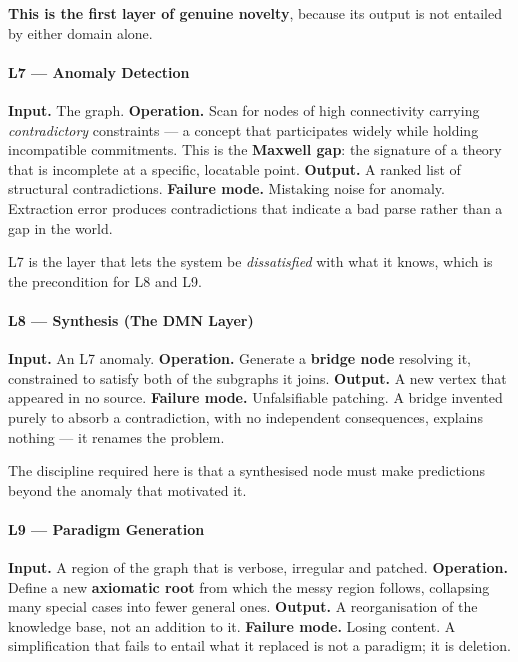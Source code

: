 \documentclass[
  11pt,
  a4paper,
]{article}
\begin{document}
\textbf{This is the first layer of genuine novelty}, because its output
is not entailed by either domain alone.

\paragraph{L7 --- Anomaly Detection}\label{l7-anomaly-detection}

\textbf{Input.} The graph. \textbf{Operation.} Scan for nodes of high
connectivity carrying \emph{contradictory} constraints --- a concept
that participates widely while holding incompatible commitments. This is
the \textbf{Maxwell gap}: the signature of a theory that is incomplete
at a specific, locatable point. \textbf{Output.} A ranked list of
structural contradictions. \textbf{Failure mode.} Mistaking noise for
anomaly. Extraction error produces contradictions that indicate a bad
parse rather than a gap in the world.

L7 is the layer that lets the system be \emph{dissatisfied} with what it
knows, which is the precondition for L8 and L9.

\paragraph{L8 --- Synthesis (The DMN
Layer)}\label{l8-synthesis-the-dmn-layer}

\textbf{Input.} An L7 anomaly. \textbf{Operation.} Generate a
\textbf{bridge node} resolving it, constrained to satisfy both of the
subgraphs it joins. \textbf{Output.} A new vertex that appeared in no
source. \textbf{Failure mode.} Unfalsifiable patching. A bridge invented
purely to absorb a contradiction, with no independent consequences,
explains nothing --- it renames the problem.

The discipline required here is that a synthesised node must make
predictions beyond the anomaly that motivated it.

\paragraph{L9 --- Paradigm Generation}\label{l9-paradigm-generation}

\textbf{Input.} A region of the graph that is verbose, irregular and
patched. \textbf{Operation.} Define a new \textbf{axiomatic root} from
which the messy region follows, collapsing many special cases into fewer
general ones. \textbf{Output.} A reorganisation of the knowledge base,
not an addition to it. \textbf{Failure mode.} Losing content. A
simplification that fails to entail what it replaced is not a paradigm;
it is deletion.
\end{document}
